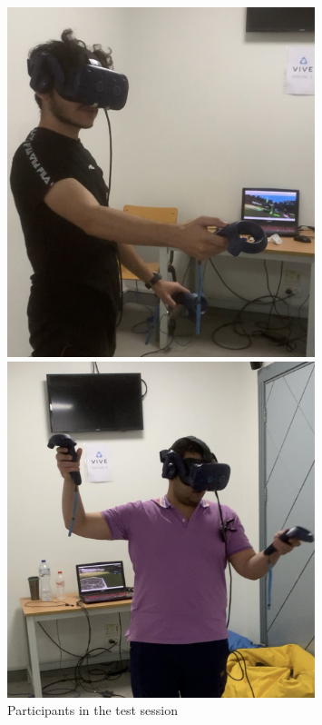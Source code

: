 \begin{figure}[H]
    \centering
    \begin{minipage}{0.45\textwidth}
        \centering
        \includegraphics[width=0.8\textwidth]{images/participant1.png}
    \end{minipage}
    \begin{minipage}{0.45\textwidth}
        \centering
        \includegraphics[width=0.8\textwidth]{images/participant2.PNG}
    \end{minipage}
    \captionsetup{justification=centering}
    \caption[]{Participants in the test session}

\end{figure}

